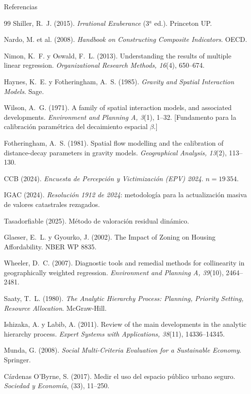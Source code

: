 \documentclass[aspectratio=169,11pt]{beamer}
\begin{document}
\begin{frame}[allowframebreaks]{Referencias}
\begin{thebibliography}{99}
    Shiller, R.~J. (2015). \textit{Irrational Exuberance} (3$^a$ ed.).
    Princeton UP.

    Nardo, M. et al. (2008). \textit{Handbook on Constructing Composite
    Indicators}. OECD.

    Nimon, K.~F. y Oswald, F.~L. (2013). Understanding the results
    of multiple linear regression.
    \textit{Organizational Research Methods, 16}(4), 650--674.

    Haynes, K.~E. y Fotheringham, A.~S. (1985).
    \textit{Gravity and Spatial Interaction Models}. Sage.

    Wilson, A.~G. (1971). A family of spatial interaction models, and
    associated developments. \textit{Environment and Planning A, 3}(1),
    1--32. [Fundamento para la calibración paramétrica del decaimiento
    espacial $\beta$.]

    Fotheringham, A.~S. (1981). Spatial flow modelling and the calibration
    of distance-decay parameters in gravity models.
    \textit{Geographical Analysis, 13}(2), 113--130.

    CCB (2024). \textit{Encuesta de Percepción y Victimización (EPV) 2024}.
    $n = 19\,354$.

    IGAC (2024). \textit{Resolución 1912 de 2024}: metodología para la
    actualización masiva de valores catastrales rezagados.

    Tasadorfiable (2025). Método de valoración residual dinámico.

    Glaeser, E.~L. y Gyourko, J. (2002). The Impact of Zoning on
    Housing Affordability. NBER WP 8835.

    Wheeler, D.~C. (2007). Diagnostic tools and remedial methods for
    collinearity in geographically weighted regression.
    \textit{Environment and Planning A, 39}(10), 2464--2481.

    Saaty, T.~L. (1980). \textit{The Analytic Hierarchy Process: Planning,
    Priority Setting, Resource Allocation}. McGraw-Hill.

    Ishizaka, A. y Labib, A. (2011). Review of the main developments in
    the analytic hierarchy process.
    \textit{Expert Systems with Applications, 38}(11), 14336--14345.

    Munda, G. (2008). \textit{Social Multi-Criteria Evaluation for a
    Sustainable Economy}. Springer.

    Cárdenas O'Byrne, S. (2017). Medir el uso del espacio público urbano
    seguro. \textit{Sociedad y Economía}, (33), 11--250.

  \end{thebibliography}
\end{frame}
\end{document}
